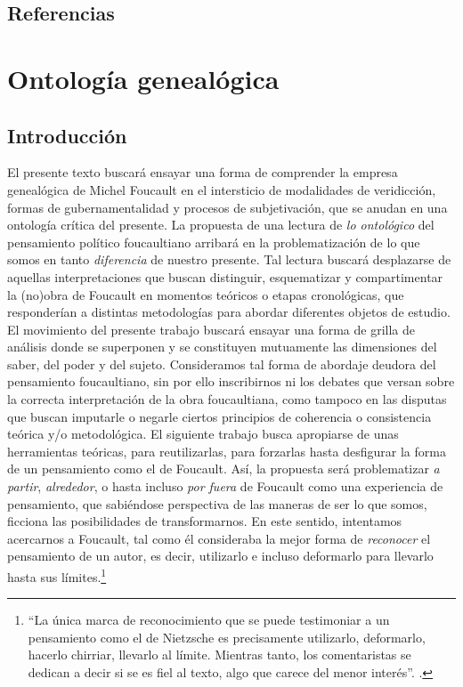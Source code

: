 \section*{Referencias}
\printbibliography[heading=none]   %

\chapter{Ontología genealógica}


\section{Introducción}

El presente texto buscará ensayar una forma de comprender la empresa genealógica de Michel Foucault en el intersticio de modalidades de veridicción, formas de gubernamentalidad y procesos de subjetivación, que se anudan en una ontología crítica del presente. La propuesta de una lectura de \emph{lo ontológico} del pensamiento político foucaultiano arribará en la problematización de lo que somos en tanto \emph{diferencia} de nuestro presente. Tal lectura buscará desplazarse de aquellas interpretaciones que buscan distinguir, esquematizar y compartimentar la (no)obra de Foucault en momentos teóricos o etapas cronológicas, que responderían a distintas metodologías para abordar diferentes objetos de estudio. El movimiento del presente trabajo buscará ensayar una forma de grilla de análisis donde se superponen y se constituyen mutuamente las dimensiones del saber, del poder y del sujeto. Consideramos tal forma de abordaje deudora del pensamiento foucaultiano, sin por ello inscribirnos ni los debates que versan sobre la correcta interpretación de la obra foucaultiana, como tampoco en las disputas que buscan imputarle o negarle ciertos principios de coherencia o consistencia teórica y/o metodológica. El siguiente trabajo busca apropiarse de unas herramientas teóricas, para reutilizarlas, para forzarlas hasta desfigurar la forma de un pensamiento como el de Foucault. Así, la propuesta será problematizar \emph{a partir}, \emph{alrededor}, o hasta incluso \emph{por fuera} de Foucault como una experiencia de pensamiento, que sabiéndose perspectiva de las maneras de ser lo que somos, ficciona las posibilidades de transformarnos. En este sentido, intentamos acercarnos a Foucault, tal como él consideraba la mejor forma de \emph{reconocer} el pensamiento de un autor, es decir, utilizarlo e incluso deformarlo para llevarlo hasta sus límites.\footnote{\enquote{La única marca de reconocimiento que se puede testimoniar a un pensamiento como el de Nietzsche es precisamente utilizarlo, deformarlo, hacerlo chirriar, llevarlo al límite. Mientras tanto, los comentaristas se dedican a decir si se es fiel al texto, algo que carece del menor interés}. \cite[Véase][610]{@7038-FOUCAULT2010}.}

